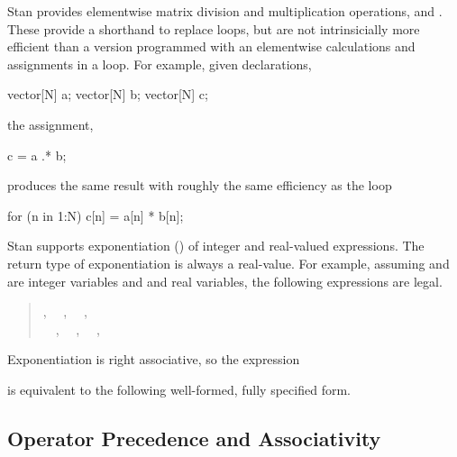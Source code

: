 Stan provides elementwise matrix division and multiplication
operations,  and .  These provide a shorthand
to replace loops, but are not intrinsicially more efficient than a
version programmed with an elementwise calculations and assignments in
a loop.  For example, given declarations,
%
\begin{stancode}
vector[N] a;
vector[N] b;
vector[N] c;
\end{stancode}
%
the assignment,
%
\begin{stancode}
c = a .* b;
\end{stancode}
%
produces the same result with roughly the same efficiency as the loop
%
\begin{stancode}
for (n in 1:N)
  c[n] = a[n] * b[n];
\end{stancode}

Stan supports exponentiation (\code{\textasciicircum}) of integer and
real-valued expressions.  The return type of exponentiation is always
a real-value.  For example, assuming  and  are integer
variables and  and  real variables, the following
expressions are legal.
%
\begin{quote}
,
\ \ ,
\ \ ,
\\
\ \ ,
\ \ ,
\ \ ,
\ \ 
\end{quote}
%
Exponentiation is right associative, so the expression
%
\begin{quote}
\end{quote}
%
is equivalent to the following well-formed, fully specified form.
%
\begin{quote}
\end{quote}
%



\subsection{Operator Precedence and Associativity}

